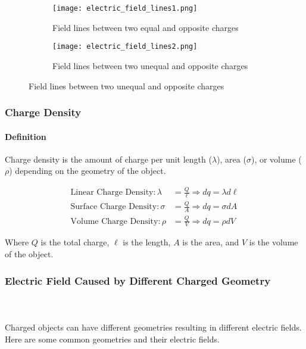 \begin{figure}[h]
    \centering
    \begin{subfigure}{0.3\textwidth}
        \centering
        \texttt{[image: electric\_field\_lines1.png]}
        \caption{Field lines between two equal and opposite charges}
    \end{subfigure}%
    \hspace{0.1\textwidth}
    \begin{subfigure}{0.3\textwidth}
        \centering
        \texttt{[image: electric\_field\_lines2.png]}
        \caption{Field lines between two unequal and opposite charges}
    \end{subfigure}
\end{figure}

\hrulefill

\subsubsection*{Charge Density}
\paragraph*{Definition}
Charge density is the amount of charge per unit length ($\lambda$), area ($\sigma$), or volume ($\rho$) depending on the geometry of the object.

\begin{align*}
    \text{Linear Charge Density} : \lambda &= \frac{Q}{\ell} \Longrightarrow dq = \lambda d\ell\\
    \text{Surface Charge Density} : \sigma &= \frac{Q}{A} \Longrightarrow dq = \sigma dA\\
    \text{Volume Charge Density} : \rho &= \frac{Q}{V} \Longrightarrow dq = \rho dV
\end{align*}

Where $Q$ is the total charge, $\ell$ is the length, $A$ is the area, and $V$ is the volume of the object.


\subsubsection*{Electric Field Caused by Different Charged Geometry}
\paragraph*{\ \ \ }
Charged objects can have different geometries resulting in different electric fields. Here are some common geometries and their electric fields.

